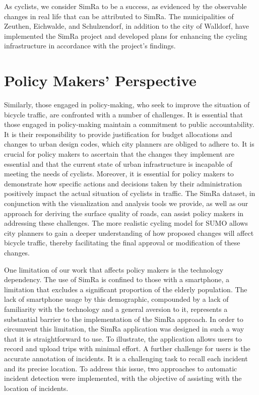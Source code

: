 As cyclists, we consider SimRa to be a success, as evidenced by the observable changes in real life that can be attributed to SimRa.
The municipalities of Zeuthen, Eichwalde, and Schulzendorf, in addition to the city of Walldorf, have implemented the SimRa project and developed plans for enhancing the cycling infrastructure in accordance with the project's findings.

\section*{Policy Makers' Perspective} 
Similarly, those engaged in policy-making, who seek to improve the situation of bicycle traffic, are confronted with a number of challenges.
It is essential that those engaged in policy-making maintain a commitment to public accountability.
It is their responsibility to provide justification for budget allocations and changes to urban design codes, which city planners are obliged to adhere to.
It is crucial for policy makers to ascertain that the changes they implement are essential and that the current state of urban infrastructure is incapable of meeting the needs of cyclists.
Moreover, it is essential for policy makers to demonstrate how specific actions and decisions taken by their administration positively impact the actual situation of cyclists in traffic.
The SimRa dataset, in conjunction with the visualization and analysis tools we provide, as well as our approach for deriving the surface quality of roads, can assist policy makers in addressing these challenges.
The more realistic cycling model for SUMO allows city planners to gain a deeper understanding of how proposed changes will affect bicycle traffic, thereby facilitating the final approval or modification of these changes.

One limitation of our work that affects policy makers is the technology dependency.
The use of SimRa is confined to those with a smartphone, a limitation that excludes a significant proportion of the elderly population. The lack of smartphone usage by this demographic, compounded by a lack of familiarity with the technology and a general aversion to it, represents a substantial barrier to the implementation of the SimRa approach.
In order to circumvent this limitation, the SimRa application was designed in such a way that it is straightforward to use.
To illustrate, the application allows users to record and upload trips with minimal effort.
A further challenge for users is the accurate annotation of incidents.
It is a challenging task to recall each incident and its precise location.
To address this issue, two approaches to automatic incident detection were implemented, with the objective of assisting with the location of incidents.

